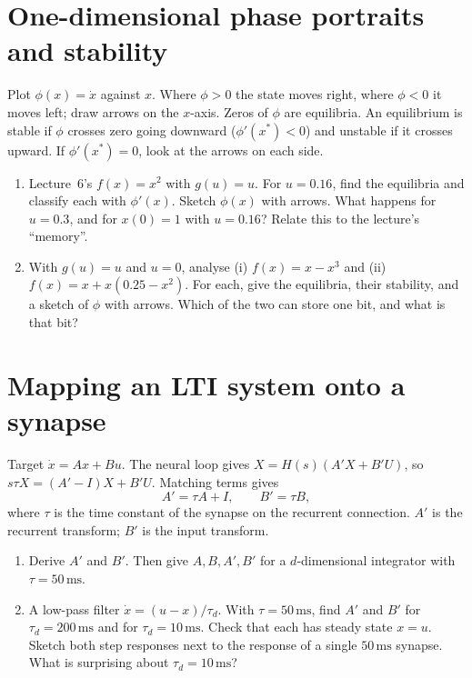 \documentclass[11pt,letterpaper]{article}
\begin{document}
\section{One-dimensional phase portraits and stability}

\begin{idea}
Plot $\phi(x) = \dot x$ against $x$. Where $\phi > 0$ the state moves right, where $\phi < 0$ it moves left; draw arrows on the $x$-axis. Zeros of $\phi$ are equilibria. An equilibrium is stable if $\phi$ crosses zero going downward ($\phi'(x^*) < 0$) and unstable if it crosses upward. If $\phi'(x^*) = 0$, look at the arrows on each side.
\end{idea}

\begin{enumerate}
\item Lecture~6's $f(x) = x^2$ with $g(u) = u$. For $u = 0.16$, find the equilibria and classify each with $\phi'(x)$. Sketch $\phi(x)$ with arrows. What happens for $u = 0.3$, and for $x(0) = 1$ with $u = 0.16$? Relate this to the lecture's ``memory''.
\item With $g(u) = u$ and $u = 0$, analyse (i) $f(x) = x - x^3$ and (ii) $f(x) = x + x(0.25 - x^2)$. For each, give the equilibria, their stability, and a sketch of $\phi$ with arrows. Which of the two can store one bit, and what is that bit?
\end{enumerate}

\section{Mapping an LTI system onto a synapse}

\begin{idea}
Target $\dot x = Ax + Bu$. The neural loop gives $X = H(s)(A'X + B'U)$, so $s\tau X = (A' - I)X + B'U$. Matching terms gives
\[
A' = \tau A + I, \qquad B' = \tau B,
\]
where $\tau$ is the time constant of the synapse on the recurrent connection. $A'$ is the recurrent transform; $B'$ is the input transform.
\end{idea}

\begin{enumerate}
\item Derive $A'$ and $B'$. Then give $A, B, A', B'$ for a $d$-dimensional integrator with $\tau = 50\,\mathrm{ms}$.
\item A low-pass filter $\dot x = (u - x)/\tau_d$. With $\tau = 50\,\mathrm{ms}$, find $A'$ and $B'$ for $\tau_d = 200\,\mathrm{ms}$ and for $\tau_d = 10\,\mathrm{ms}$. Check that each has steady state $x = u$. Sketch both step responses next to the response of a single $50\,\mathrm{ms}$ synapse. What is surprising about $\tau_d = 10\,\mathrm{ms}$?
\end{enumerate}
\end{document}
